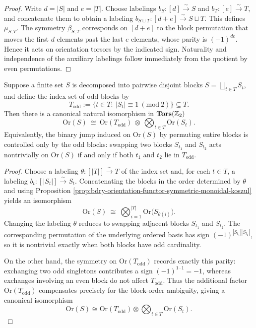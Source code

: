\begin{proof}
Write \(d=|S|\) and \(e=|T|\).
Choose labelings \(b_S:[d]\xrightarrow{\sim}S\) and \(b_T:[e]\xrightarrow{\sim}T\), and concatenate them to obtain a labeling
\(
b_{S\sqcup T}:[d+e]\xrightarrow{\sim}S\sqcup T
\).
This defines \(\mu_{S,T}\).
The symmetry \(\beta_{S,T}\) corresponds on \([d+e]\) to the block permutation that moves the first \(d\) elements past the last \(e\) elements, whose parity is \((-1)^{de}\).
Hence it acts on orientation torsors by the indicated sign.
Naturality and independence of the auxiliary labelings follow immediately from the quotient by even permutations. \qedhere
\end{proof}

\begin{proposition}\label{prop:bdry-orientation-block-decomposition-odd-visibility}
Suppose a finite set \(S\) is decomposed into pairwise disjoint blocks
\(
S=\bigsqcup_{t\in T}S_t
\),
and define the index set of odd blocks by
\[
T_{\mathrm{odd}}:=\{t\in T:\ |S_t|\equiv 1\ (\mathrm{mod}\ 2)\}\subseteq T.
\]
Then there is a canonical natural isomorphism in \(\mathbf{Tors}(\mathbb{Z}_2)\)
\[
\mathrm{Or}(S)\ \cong\ \mathrm{Or}(T_{\mathrm{odd}})\ \otimes\ \bigotimes_{t\in T}\mathrm{Or}(S_t).
\]
Equivalently, the binary jump induced on \(\mathrm{Or}(S)\) by permuting entire blocks is controlled only by the odd blocks: swapping two blocks \(S_{t_1}\) and \(S_{t_2}\) acts nontrivially on \(\mathrm{Or}(S)\) if and only if both \(t_1\) and \(t_2\) lie in \(T_{\mathrm{odd}}\).
\end{proposition}

\begin{proof}
Choose a labeling \(\theta:[|T|]\xrightarrow{\sim}T\) of the index set and, for each \(t\in T\), a labeling \(b_t:[|S_t|]\xrightarrow{\sim}S_t\).
Concatenating the blocks in the order determined by \(\theta\) and using Proposition \ref{prop:bdry-orientation-functor-symmetric-monoidal-koszul} yields an isomorphism
\[
\mathrm{Or}(S)\ \cong\ \bigotimes_{i=1}^{|T|}\mathrm{Or}\!\bigl(S_{\theta(i)}\bigr).
\]
Changing the labeling \(\theta\) reduces to swapping adjacent blocks \(S_{t_1}\) and \(S_{t_2}\).
The corresponding permutation of the underlying ordered basis has sign \((-1)^{|S_{t_1}||S_{t_2}|}\), so it is nontrivial exactly when both blocks have odd cardinality.
\par
On the other hand, the symmetry on \(\mathrm{Or}(T_{\mathrm{odd}})\) records exactly this parity: exchanging two odd singletons contributes a sign \((-1)^{1\cdot 1}=-1\), whereas exchanges involving an even block do not affect \(T_{\mathrm{odd}}\).
Thus the additional factor \(\mathrm{Or}(T_{\mathrm{odd}})\) compensates precisely for the block-order ambiguity, giving a canonical isomorphism
\[
\mathrm{Or}(S)\cong \mathrm{Or}(T_{\mathrm{odd}})\otimes\bigotimes_{t\in T}\mathrm{Or}(S_t).
\]
\end{proof}

